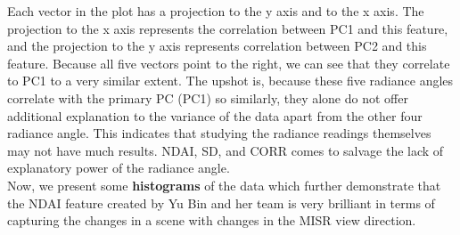 \documentclass[jou]{apa}%
\begin{document}
Each vector in the plot has a projection to the y axis and to the x axis. The projection to the x axis represents the correlation between PC1 and this feature, and the projection to the y axis represents correlation between PC2 and this feature. Because all five vectors point to the right, we can see that they correlate to PC1 to a very similar extent. The upshot is, because these five radiance angles correlate with the primary PC (PC1) so similarly, they alone do not offer additional explanation to the variance of the data apart from the other four radiance angle. This indicates that studying the radiance readings themselves may not have much results. NDAI, SD, and CORR comes to salvage the lack of explanatory power of the radiance angle.\\
\indent Now, we present some \textbf{histograms} of the data which further demonstrate that the NDAI feature created by Yu Bin and her team is very brilliant in terms of capturing the changes in a scene with changes in the MISR view direction.
\end{document}
